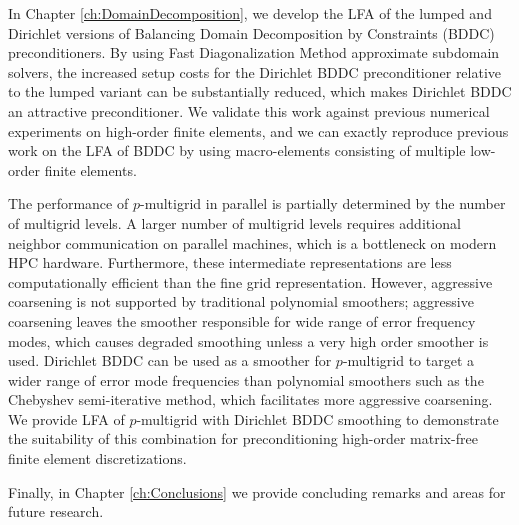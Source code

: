 In Chapter \ref{ch:DomainDecomposition}, we develop the LFA of the lumped and Dirichlet versions of Balancing Domain Decomposition by Constraints (BDDC) preconditioners.
By using Fast Diagonalization Method approximate subdomain solvers, the increased setup costs for the Dirichlet BDDC preconditioner relative to the lumped variant can be substantially reduced, which makes Dirichlet BDDC an attractive preconditioner.
We validate this work against previous numerical experiments on high-order finite elements, and we can exactly reproduce previous work \cite{brown2019local} on the LFA of BDDC by using macro-elements consisting of multiple low-order finite elements.

The performance of $p$-multigrid in parallel is partially determined by the number of multigrid levels.
A larger number of multigrid levels requires additional neighbor communication on parallel machines, which is a bottleneck on modern HPC hardware.
Furthermore, these intermediate representations are less computationally efficient than the fine grid representation.
However, aggressive coarsening is not supported by traditional polynomial smoothers; aggressive coarsening leaves the smoother responsible for wide range of error frequency modes, which causes degraded smoothing unless a very high order smoother is used.
Dirichlet BDDC can be used as a smoother for $p$-multigrid to target a wider range of error mode frequencies than polynomial smoothers such as the Chebyshev semi-iterative method, which facilitates more aggressive coarsening.
We provide LFA of $p$-multigrid with Dirichlet BDDC smoothing to demonstrate the suitability of this combination for preconditioning high-order matrix-free finite element discretizations.

Finally, in Chapter \ref{ch:Conclusions} we provide concluding remarks and areas for future research.